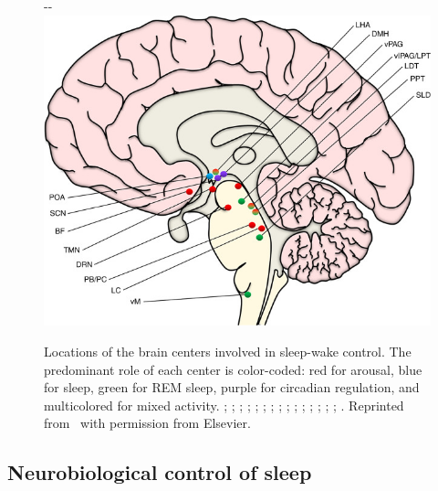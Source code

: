             \begin{figure}[tb]
                \begin{adjustwidth*}{}{-\marginparwidth-\marginparsep}
                \centering
                \includegraphics[width=\textwidth]{figures/clinical-background/AnatomyPhysiologySleep/Figure1_1.jpg}
                \caption[Brain centers involved in sleep-wake control.]{%
                Locations of the brain centers involved in sleep-wake control. %
                The predominant role of each center is color-coded: red for arousal, blue for sleep, green for \ac{REM} sleep, purple for circadian regulation, and multicolored for mixed activity. %
                ; %
                ; %
                ; %
                ; %
                ; %
                ; %
                ; %
                ; %
                ; %
                ; %
                ; %
                ; %
                ; %
                ; %
                ; %
                . %
                Reprinted from~\cite{Schneider2017} with permission from Elsevier.}
                \label{fig:clinical-background:sleep-wake-control}
                \end{adjustwidth*}
            \end{figure}
            
            
        \subsection{Neurobiological control of sleep}\label{sec:control-sleep}
            
